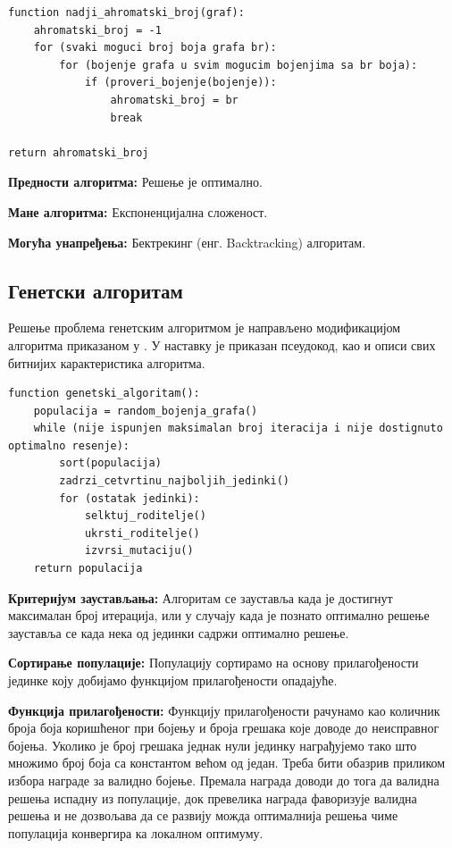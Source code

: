 \documentclass[a4paper]{article}
\begin{document}
{\begin{lstlisting}[caption={Псеудо-код алгоритма исцрпне претраге},frame=single]
function nadji_ahromatski_broj(graf):
	ahromatski_broj = -1
	for (svaki moguci broj boja grafa br):
		for (bojenje grafa u svim mogucim bojenjima sa br boja):
			if (proveri_bojenje(bojenje)):
				ahromatski_broj = br
				break
		
return ahromatski_broj 
\end{lstlisting}

\textbf{Предности алгоритма:} Решење је оптимално.

\textbf{Мане алгоритма:} Експоненцијална сложеност.

\textbf{Могућа унапређења:} Бектрекинг (енг. Backtracking) алгоритам.

\subsection{Генетски алгоритам}
Решење проблема генетским алгоритмом је направљено модификацијом алгоритма приказаном у \cite{geneticachr}. У наставку је приказан псеудокод, као и описи свих битнијих карактеристика алгоритма.

\begin{lstlisting}[caption={Псеудо-код генетског алгоритма},frame=single]
function genetski_algoritam():
	populacija = random_bojenja_grafa()
	while (nije ispunjen maksimalan broj iteracija i nije dostignuto optimalno resenje):
		sort(populacija)
		zadrzi_cetvrtinu_najboljih_jedinki()
		for (ostatak jedinki):
			selktuj_roditelje()
			ukrsti_roditelje()
			izvrsi_mutaciju()
	return populacija
\end{lstlisting}

\textbf{Критеријум заустављања:} Алгоритам се зауставља када је достигнут максималан број итерација, или у случају када је познато оптимално решење зауставља се када нека од јединки садржи оптимално решење.

\textbf{Сортирање популације:} Популацију сортирамо на основу прилагођености јединке коју добијамо функцијом прилагођености опадајуће. 

\textbf{Функција прилагођености:} Функцију прилагођености рачунамо као количник броја боја коришћеног при бојењу и броја грешака које доводе до неисправног бојења. Уколико је број грешака једнак нули јединку награђујемо тако што множимо број боја са константом већом од један. Треба бити обазрив приликом избора награде за валидно бојење. Премала награда доводи до тога да валидна решења испадну из популације, док превелика награда фаворизује валидна решења и не дозвољава да се развију можда оптималнија решења чиме популација конвергира ка локалном оптимуму.

}
\end{document}
